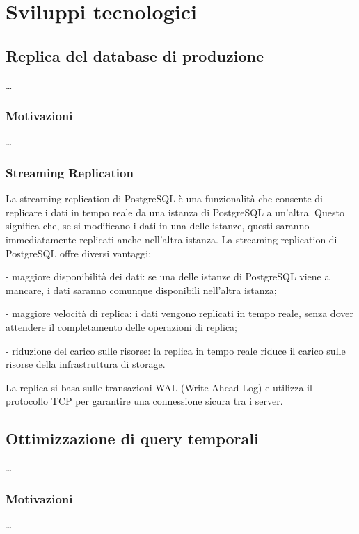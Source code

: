 \chapter{Sviluppi tecnologici}\label{ch:sviluppi}

\section{Replica del database di produzione}\label{sec:replica}
\ldots

\subsection{Motivazioni}\label{ssec:replica-motivazioni}
\ldots

\subsection{Streaming Replication}\label{ssec:streaming-replication}
La streaming replication di PostgreSQL è una funzionalità che consente di replicare i dati in tempo reale da una istanza di PostgreSQL a un'altra. Questo significa che, se si modificano i dati in una delle istanze, questi saranno immediatamente replicati anche nell'altra istanza. La streaming replication di PostgreSQL offre diversi vantaggi:

- maggiore disponibilità dei dati: se una delle istanze di PostgreSQL viene a mancare, i dati saranno comunque disponibili nell'altra istanza;

- maggiore velocità di replica: i dati vengono replicati in tempo reale, senza dover attendere il completamento delle operazioni di replica;

- riduzione del carico sulle risorse: la replica in tempo reale riduce il carico sulle risorse della infrastruttura di storage.

La replica si basa sulle transazioni WAL (Write Ahead Log) e utilizza il protocollo TCP per garantire una connessione sicura tra i server.

\section{Ottimizzazione di query temporali}\label{sec:cont-aggr}
\ldots

\subsection{Motivazioni}\label{ssec:cont-aggr-motivazioni}
\ldots

